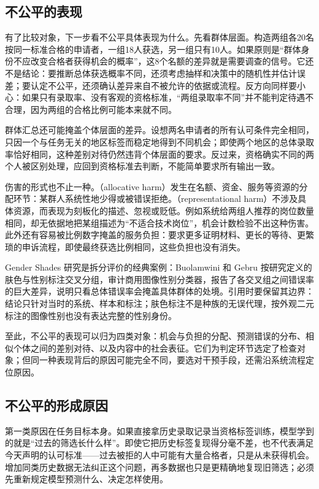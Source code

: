\subsection{不公平的表现}
\label{sec:fairness-manifestations}

有了比较对象，下一步看不公平具体表现为什么。先看群体层面。构造两组各20名按同一标准合格的申请者，一组18人获选，另一组只有10人。如果原则是“群体身份不应改变合格者获得机会的概率”，这8个名额的差异就是需要调查的信号。它还不是结论：要推断总体获选概率不同，还须考虑抽样和决策中的随机性并估计误差；要认定不公平，还须确认差异来自不被允许的依据或流程。反方向同样要小心：如果只有录取率、没有客观的资格标准，“两组录取率不同”并不能判定待遇不合理，因为两组的合格比例可能本来就不同。

群体汇总还可能掩盖个体层面的差异。设想两名申请者的所有认可条件完全相同，只因一个与任务无关的地区标签而稳定地得到不同机会；即使两个地区的总体录取率恰好相同，这种差别对待仍然违背个体层面的要求。反过来，资格确实不同的两个人被区别处理，应回到资格标准去判断，不能简单要求所有输出一致。

伤害的形式也不止一种。（allocative harm）发生在名额、资金、服务等资源的分配环节：某群人系统性地少得或被错误拒绝。（representational harm）不涉及具体资源，而表现为刻板化的描述、忽视或贬低。例如系统给两组人推荐的岗位数量相同，却无依据地把某组描述为“不适合技术岗位”，机会计数检验不出这种伤害。此外还有容易被比例数字掩盖的服务负担：要求更多证明材料、更长的等待、更繁琐的申诉流程，即使最终获选比例相同，这些负担也没有消失。

Gender Shades 研究是拆分评价的经典案例：Buolamwini 和 Gebru 按研究定义的肤色与性别标注交叉分组，审计商用图像性别分类器，报告了各交叉组之间错误率的巨大差异，说明只看总体错误率会掩盖具体群体的处境。引用时要保留其边界：结论只针对当时的系统、样本和标注；肤色标注不是种族的无误代理，按外观二元标注的图像性别也没有表达完整的性别身份。

至此，不公平的表现可以归为四类对象：机会与负担的分配、预测错误的分布、相似个体之间的差别对待、以及内容中的社会表征。它们为判定环节选定了检查对象；但同一种表现背后的原因可能完全不同，要选对干预手段，还需沿系统流程定位原因。

\subsection{不公平的形成原因}
\label{sec:fairness-causes}

第一类原因在任务目标本身。如果直接拿历史录取记录当资格标签训练，模型学到的就是“过去的筛选长什么样”。即使它把历史标签复现得分毫不差，也不代表满足今天声明的认可标准——过去被拒的人中可能有大量合格者，只是从未获得机会。增加同类历史数据无法纠正这个问题，再多数据也只是更精确地复现旧筛选；必须先重新规定模型预测什么、决定怎样使用。

